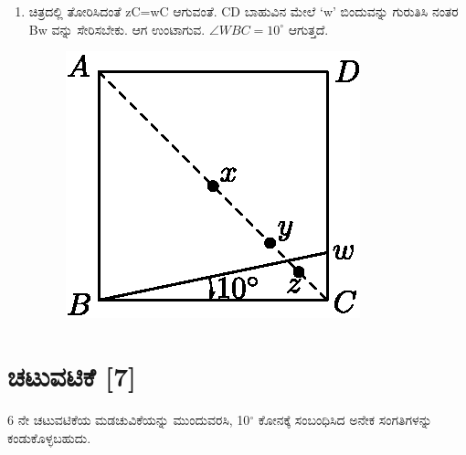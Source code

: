 \begin{enumerate}
\item ಚಿತ್ರದಲ್ಲಿ ತೋರಿಸಿದಂತೆ zC=wC ಆಗುವಂತೆ. CD ಬಾಹುವಿನ ಮೇಲೆ  `w' ಬಿಂದುವನ್ನು ಗುರುತಿಸಿ ನಂತರ Bw ವನ್ನು ಸೇರಿಸಬೇಕು. ಆಗ ಉಂಟಾಗುವ. $\angle WBC = 10^\circ$ ಆಗುತ್ತದೆ. 
\begin{figure}[H]
\centering
\includegraphics[scale=.98]{src/figure/chap1/fig1-12c.eps}
\end{figure}
\end{enumerate}

\section*{ಚಟುವಟಿಕೆ [7]}  6 ನೇ ಚಟುವಟಿಕೆಯ ಮಡಚುವಿಕೆಯನ್ನು ಮುಂದುವರಸಿ, 10$^\circ$ ಕೋನಕ್ಕೆ ಸಂಬಂಧಿಸಿದ ಅನೇಕ ಸಂಗತಿಗಳನ್ನು ಕಂಡುಕೊಳ್ಳಬಹುದು. 

